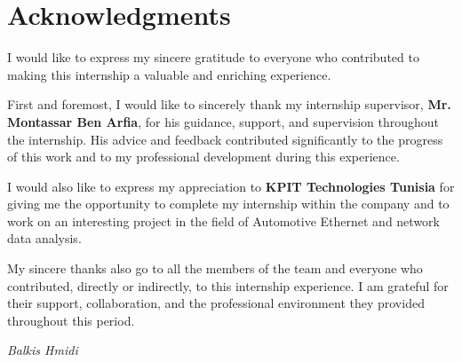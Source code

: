\chapter*{Acknowledgments}

\vspace*{\fill}

\begin{center}
\begin{minipage}{0.82\textwidth}
\centering

I would like to express my sincere gratitude to everyone who contributed to making this internship a valuable and enriching experience.

\vspace{0.4cm}

First and foremost, I would like to sincerely thank my internship supervisor, \textbf{Mr. Montassar Ben Arfia}, for his guidance, support, and supervision throughout the internship. His advice and feedback contributed significantly to the progress of this work and to my professional development during this experience.

\vspace{0.4cm}

I would also like to express my appreciation to \textbf{KPIT Technologies Tunisia} for giving me the opportunity to complete my internship within the company and to work on an interesting project in the field of Automotive Ethernet and network data analysis.

\vspace{0.4cm}

My sincere thanks also go to all the members of the team and everyone who contributed, directly or indirectly, to this internship experience. I am grateful for their support, collaboration, and the professional environment they provided throughout this period.

\vspace{0.4cm}

\begin{flushright}
\textit{Balkis Hmidi}
\end{flushright}

\end{minipage}
\end{center}

\vspace*{\fill}